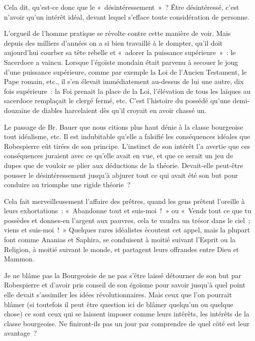 \documentclass[french,twoside]{book} %
\begin{document}
Cela dit, qu’est-ce donc que le « désintéressement » ? Être désintéressé, c’est n’avoir qu’un intérêt idéal, devant lequel s’efface toute considération de personne.\par
L’orgueil de l’homme pratique se révolte contre cette manière de voir. Mais depuis des milliers d’années on a si bien travaillé à le dompter, qu’il doit aujourd’hui courber sa tête rebelle et « adorer la puissance supérieure » : le Sacerdoce a vaincu. Lorsque l’égoïste mondain était parvenu à secouer le joug d’une puissance supérieure, comme par exemple la Loi de l’Ancien Testament, le Pape romain, etc., il s’en élevait immédiatement au-dessus de lui une autre, dix fois supérieure : la Foi prenait la place de la Loi, l’élévation de tous les laïques au sacerdoce remplaçait le clergé fermé, etc. C’est l’histoire du possédé qu’une demi-douzaine de diables harcelaient dès qu’il croyait en avoir chassé un.\par
Le passage de Br. Bauer que nous citions plus haut dénie à la classe bourgeoise tout idéalisme, etc. Il est  indubitable qu’elle a falsifié les conséquences idéales que Robespierre eût tirées de son principe. L’instinct de son intérêt l’a avertie que ces conséquences juraient avec ce qu’elle avait en vue, et que ce serait un jeu de dupes que de vouloir se plier aux déductions de la théorie. Devait-elle peut-être pousser le désintéressement jusqu’à abjurer tout ce qui avait été son but pour conduire au triomphe une rigide théorie ?\par
Cela fait merveilleusement l’affaire des prêtres, quand les gens prêtent l’oreille à leurs exhortations : « Abandonne tout et suis-moi ! » ou « Vends tout ce que tu possèdes et donnes-en l’argent aux pauvres, cela te vaudra un trésor dans le ciel ; viens et suis-moi ! » Quelques rares idéalistes écoutent cet appel, mais la plupart font comme Ananias et Saphira, se conduisent à moitié suivant l’Esprit ou la Religion, à moitié suivant le monde, et partagent leurs offrandes entre Dieu et Mammon.\par
Je ne blâme pas la Bourgeoisie de ne pas s’être laissé détourner de son but par Robespierre et d’avoir pris conseil de son égoïsme pour savoir jusqu’à quel point elle devait s’assimiler les idées révolutionnaires. Mais ceux que l’on pourrait blâmer (si toutefois il peut être question ici de blâmer quelqu’un ou quelque chose) ce sont ceux qui se laissent imposer comme leurs intérêts, les intérêts de la classe bourgeoise. Ne finiront-ils pas un jour par comprendre de quel côté est leur avantage ?\par
\end{document}
